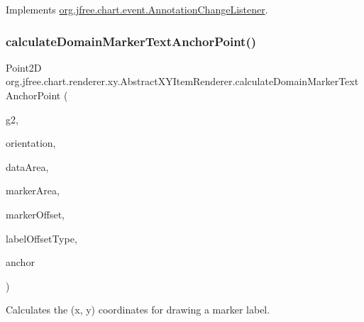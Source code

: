 Implements \mbox{\hyperlink{interfaceorg_1_1jfree_1_1chart_1_1event_1_1_annotation_change_listener_ac7367f136960e9a914a759b69595c535}{org.\+jfree.\+chart.\+event.\+Annotation\+Change\+Listener}}.

\mbox{\label{classorg_1_1jfree_1_1chart_1_1renderer_1_1xy_1_1_abstract_x_y_item_renderer_accfab3e67da90db2cf0b7b42d4058e12}} 
\subsubsection{\texorpdfstring{calculate\+Domain\+Marker\+Text\+Anchor\+Point()}{calculateDomainMarkerTextAnchorPoint()}}
{\footnotesize\ttfamily Point2D org.\+jfree.\+chart.\+renderer.\+xy.\+Abstract\+X\+Y\+Item\+Renderer.\+calculate\+Domain\+Marker\+Text\+Anchor\+Point (\begin{DoxyParamCaption}\item[{Graphics2D}]{g2,  }\item[{\mbox{\hyperlink{classorg_1_1jfree_1_1chart_1_1plot_1_1_plot_orientation}{Plot\+Orientation}}}]{orientation,  }\item[{Rectangle2D}]{data\+Area,  }\item[{Rectangle2D}]{marker\+Area,  }\item[{Rectangle\+Insets}]{marker\+Offset,  }\item[{Length\+Adjustment\+Type}]{label\+Offset\+Type,  }\item[{Rectangle\+Anchor}]{anchor }\end{DoxyParamCaption})\hspace{0.3cm}{\ttfamily [protected]}}

Calculates the (x, y) coordinates for drawing a marker label.



